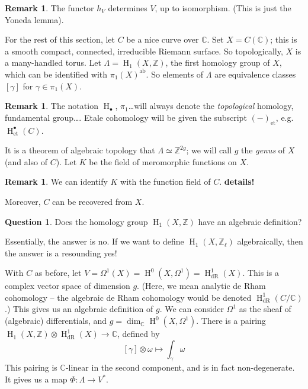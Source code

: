 \documentclass{article}
\DeclareMathOperator{\h}{H}
\theoremstyle{definition}
\newtheorem{question}[subsection]{Question}
\newtheorem{remark}[subsection]{Remark}
\begin{document}
\begin{remark}
The functor $h_V$ determines $V$, up to isomorphism. (This is just the Yoneda 
lemma).
\end{remark}

For the rest of this section, let $C$ be a nice curve over $\mathbb{C}$. Set 
$X=C(\mathbb{C})$; this is a smooth compact, connected, irreducible Riemann 
surface. So topologically, $X$ is a many-handled torus. Let 
$\Lambda=\h_1(X,\mathbb{Z})$, the first homology group of $X$, which can be 
identified with $\pi_1(X)^\text{ab}$. So elements of $\Lambda$ are 
equivalence classes $[\gamma]$ for $\gamma\in \pi_1(X)$. 

\begin{remark}
The notation $\h_\bullet$, $\pi_1$\ldots will always denote the 
\emph{topological} homology, fundamental group\ldots. Etale cohomology 
will be given the subscript $(-)_\text{et}$, e.g. $\h_\text{et}^\bullet(C)$.
\end{remark}

It is a theorem of algebraic topology that $\Lambda\simeq\mathbb{Z}^{2 g}$; we 
will call $g$ the \emph{genus} of $X$ (and also of $C$). Let $K$ be the field 
of meromorphic functions on $X$. 

\begin{remark}
We can identify $K$ with the function field of $C$. \textbf{details!}

Moreover, $C$ can be recovered from $X$. 
\end{remark}

\begin{question}
Does the homology group $\h_1(X,\mathbb{Z})$ have an algebraic definition?
\end{question}

Essentially, the answer is no. If we want to define $\h_1(X,\mathbb{Z}_\ell)$ 
algebraically, then the answer is a resounding yes!

With $C$ as before, let $V=\Omega^1(X)=\h^0(X,\Omega^1)=\h^1_\text{dR}(X)$. 
This is a complex vector space of dimension $g$. (Here, we mean analytic de 
Rham cohomology -- the algebraic de Rham cohomology would be denoted 
$\h_\text{dR}^1(C/\mathbb{C})$.) This gives us an algebraic definition of $g$. 
We can consider $\Omega^1$ as the sheaf of (algebraic) differentials, and 
$g=\dim_\mathbb{C}\h^0(X,\Omega^1)$. There is a pairing 
$\h_1(X,\mathbb{Z})\otimes\h_\text{dR}^1(X)\to\mathbb{C}$, defined by 
\[
  [\gamma]\otimes \omega \mapsto \int_\gamma \omega
\]
This pairing is $\mathbb{C}$-linear in the second component, and is in fact 
non-degenerate. It gives us a map $\Phi:\Lambda\to V^*$. 
\end{document}
